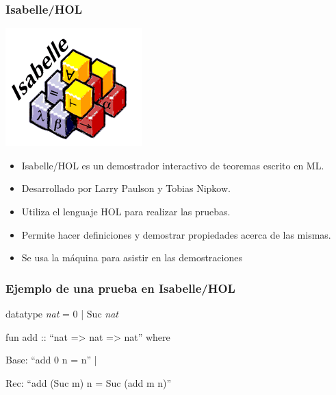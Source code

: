 \begin{frame}
\frametitle{Isabelle/HOL}

\includegraphics[scale=0.5]{images/isabelle.png}

\begin{itemize}
\item{Isabelle/HOL es un demostrador interactivo de teoremas escrito en ML.}
\pause
\item{Desarrollado por Larry Paulson y Tobias Nipkow.}
\pause
\item{Utiliza el lenguaje HOL para realizar las pruebas.}
\pause
\item{Permite hacer definiciones y demostrar propiedades acerca de las mismas.}
\pause
\item{Se usa la máquina para asistir en las demostraciones}
\pause
\end{itemize}

\end{frame}

\begin{frame}
\frametitle{Ejemplo de una prueba en Isabelle/HOL}

\begin{semiverbatim}
datatype \textit{nat} = 0 | Suc \textit{nat}


fun add :: ``nat => nat => nat'' where

Base: ``add 0 n = n'' |

Rec: ``add (Suc m) n = Suc (add m n)''
\end{semiverbatim}

\end{frame}

